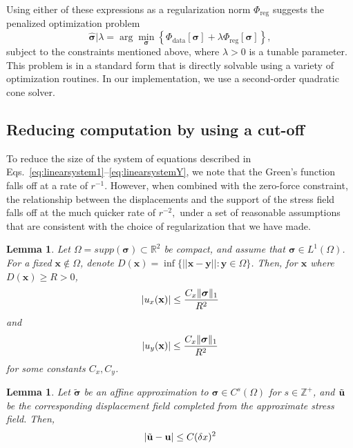 \documentclass[aps,prl,reprint,twocolumn,groupedaddress,showpacs]{revtex4-1}
\newtheorem{lem}[thm]{Lemma}%
\DeclarePairedDelimiter{\norm}{\lVert}{\rVert}
\newcommand{\bsigma}{{\boldsymbol\sigma}}
\def\u{{\bf u}}
\begin{document}
Using either of these expressions as a regularization norm $\Phi_{\textrm{reg}}$ suggests the penalized optimization problem
\begin{equation}
\hat{\bsigma} \big\vert \lambda = \arg\min_{\bsigma} \left\{ \Phi_{\textrm{data}}[\bsigma] + \lambda\Phi_{\textrm{reg}}[\bsigma] \right\},\label{eq:objective}
\end{equation}
subject to the constraints mentioned above,
where $\lambda>0$ is a tunable parameter. This problem
 is in a standard form that is directly solvable using a variety of optimization routines.
  In our implementation, we use a second-order  quadratic cone solver. 
\subsection{Reducing computation by using a cut-off}
To reduce the size of the system of equations described in Eqs.~\ref{eq:linearsystem1}--\ref{eq:linearsystemY}, we note that the Green's function falls off at a rate of $r^{-1}$. However,
when combined with the zero-force constraint, the relationship between the displacements
and the support of the stress field falls off at the much quicker rate of $r^{-2},$ under a
set of reasonable assumptions that are consistent with the choice of regularization that we have
made.

\begin{lem} 
      \label{lem:multipole}
Let $\Omega = supp(\bsigma)\subset \mathbb{R}^2$ be compact, and assume that $\bsigma\in L^1(\Omega)$. For a fixed $\mathbf{x}\not\in\Omega$, denote $D(\mathbf{x}) = \inf\{ || \mathbf{x} -\mathbf{y}|| : \mathbf{y}\in\Omega \}$. Then, for $\mathbf{x}$ where $D(\mathbf{x})\geq R>0$, 
\begin{equation}
\vert u_x(\mathbf{x}) \vert \leq \frac{C_x\norm{\bsigma}_1}{R^2}
\end{equation}      
and
\begin{equation}
\vert u_y(\mathbf{x}) \vert \leq \frac{C_x\norm{\bsigma}_1}{R^2}
\end{equation}      
for some constants $C_x,C_y$.

\end{lem}

\begin{lem}
\label{lem:affine_error}
Let $\tilde{\bsigma}$ be an affine approximation to $\bsigma\in C^s(\Omega)$ for $s\in\mathbb{Z}^+$, and $\tilde{\u}$ be the corresponding displacement field completed from the approximate stress field. Then, 
\begin{equation}
\vert \tilde{\u}  - \u \vert \leq C (\delta x)^2
\end{equation}
\end{lem}
\end{document}

